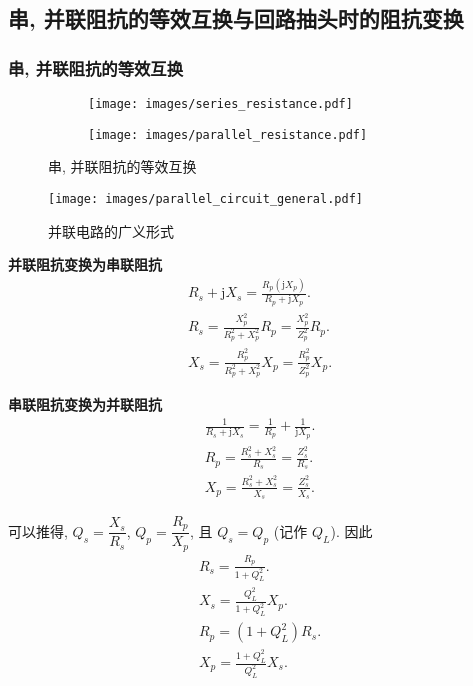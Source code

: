 \subsection{串, 并联阻抗的等效互换与回路抽头时的阻抗变换} \label{串, 并联阻抗的等效互换与回路抽头时的阻抗变换}
\subsubsection{串, 并联阻抗的等效互换}
\begin{figure}[H]
    \centering
    \begin{minipage}{.53\textwidth}
        \centering
        \begin{subfigure}{.18\textwidth}
            \centering
            \texttt{[image: images/series\_resistance.pdf]}
        \end{subfigure}
        \begin{subfigure}{.28\textwidth}
            \centering
            \texttt{[image: images/parallel\_resistance.pdf]}
        \end{subfigure}
        \caption{串, 并联阻抗的等效互换}
    \end{minipage}
    \begin{minipage}{.40\textwidth}
        \centering
        \texttt{[image: images/parallel\_circuit\_general.pdf]}
        \caption{并联电路的广义形式}
    \end{minipage}
\end{figure}

\textbf{并联阻抗变换为串联阻抗}
\begin{gather}
    \nonumber R_s+\mathrm{j}X_s=\frac{R_p(\mathrm{j}X_p)}{R_p+\mathrm{j}X_p}. \\
    R_s=\frac{X_p^2}{R_p^2+X_p^2}R_p=\frac{X_p^2}{Z_p^2}R_p. \\
    X_s=\frac{R_p^2}{R_p^2+X_p^2}X_p=\frac{R_p^2}{Z_p^2}X_p.
\end{gather}

\textbf{串联阻抗变换为并联阻抗}
\begin{gather}
    \nonumber \frac{1}{R_s+\mathrm{j}X_s}=\frac{1}{R_p}+\frac{1}{\mathrm{j}X_p}. \\
    R_p=\frac{R_s^2+X_s^2}{R_s}=\frac{Z_s^2}{R_s}. \\
    X_p=\frac{R_s^2+X_s^2}{X_s}=\frac{Z_s^2}{X_s}.
\end{gather}

可以推得, $Q_s=\dfrac{X_s}{R_s}$, $Q_p=\dfrac{R_p}{X_p}$, 且 $Q_s=Q_p$ (记作 $Q_L$). 因此
\begin{gather}
    R_s=\frac{R_p}{1+Q_L^2}. \\
    X_s=\frac{Q_L^2}{1+Q_L^2}X_p. \\
    R_p=(1+Q_L^2)R_s. \\
    X_p=\frac{1+Q_L^2}{Q_L^2}X_s.
\end{gather}

